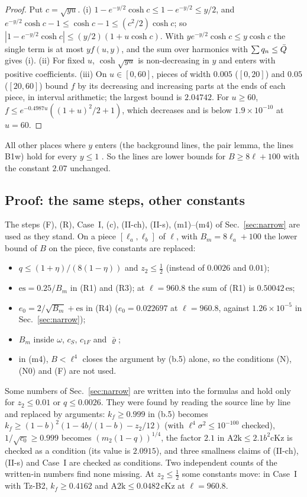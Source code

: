 \begin{proof}
Put $c=\sqrt{yu}$.
(i) $1-e^{-y/2}\cosh c\le1-e^{-y/2}\le y/2$, and $e^{-y/2}\cosh c-1\le\cosh c-1\le(c^2/2)\cosh c$; so $|1-e^{-y/2}\cosh c|\le(y/2)(1+u\cosh c)$. With $ye^{-y/2}\cosh c\le y\cosh c$ the single term is at most $y f(u,y)$, and the sum over harmonics with $\sum q_n\le\bar Q$ gives (i).
(ii) For fixed $u$, $\cosh\sqrt{yu}$ is non-decreasing in $y$ and enters with positive coefficients.
(iii) On $u\in[0,60]$, pieces of width $0.005$ ($[0,20]$) and $0.05$ ($[20,60]$) bound $f$ by its decreasing and increasing parts at the ends of each piece, in interval arithmetic; the largest bound is $2.04742$. For $u\ge60$, $f\le e^{-0.4987u}((1+u)^2/2+1)$, which decreases and is below $1.9\times10^{-10}$ at $u=60$.
\end{proof}

All other places where $y$ enters (the background lines, the pair lemma, the lines B1w) hold for every $y\le1$ \proofst.
So the lines are lower bounds for $B\ge8\ell+100$ with the constant $2.07$ unchanged.

\subsection{Proof: the same steps, other constants}

The steps (F), (R), Case~I, (c), (II-ch), (II-s), (m1)--(m4) of Sec.~\ref{sec:narrow} are used as they stand.
On a piece $[\ell_a,\ell_b]$ of $\ell$, with $B_m=8\ell_a+100$ the lower bound of $B$ on the piece, five constants are replaced:
\begin{itemize}
\item $q\le(1+\eta)/(8(1-\eta))$ and $z_2\le\tfrac12$ (instead of $0.0026$ and $0.01$);
\item $\mathrm{es}=0.25/B_m$ in (R1) and (R3); at $\ell=960.8$ the sum of (R1) is $0.50042\,\mathrm{es}$;
\item $e_0=2/\sqrt{B_m}+\mathrm{es}$ in (R4) ($e_0=0.022697$ at $\ell=960.8$, against $1.26\times10^{-5}$ in Sec.~\ref{sec:narrow});
\item $B_m$ inside $\omega$, $c_S$, $c_{1F}$ and $\bar\varrho$;
\item in (m4), $B<\ell^4$ closes the argument by (b.5) alone, so the conditions (N), (N0) and (F) are not used.
\end{itemize}
Some numbers of Sec.~\ref{sec:narrow} are written into the formulas and hold only for $z_2\le0.01$ or $q\le0.0026$.
They were found by reading the source line by line and replaced by arguments: $k_f\ge0.999$ in (b.5) becomes $k_f\ge(1-b)^2(1-4b/(1-b)-z_2/12)$ (with $\ell^4\sigma^2\le10^{-100}$ checked), $1/\sqrt{c_0}\ge0.999$ becomes $(m_2(1-q))^{1/4}$, the factor $2.1$ in $\mathrm{A2k}\le2.1b^2\mathrm{cKz}$ is checked as a condition (its value is $2.0915$), and three smallness claims of (II-ch), (II-s) and Case~I are checked as conditions.
Two independent counts of the written-in numbers find none missing.
At $z_2\le\tfrac12$ some constants move: in Case~I with Tz-B2, $k_f\ge0.4162$ and $\mathrm{A2k}\le0.0482\,\mathrm{cKz}$ at $\ell=960.8$.

